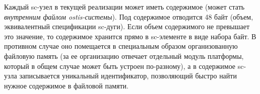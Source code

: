 \begin{SCn}
{Каждый sc-узел в текущей реализации может иметь содержимое (может стать \textit{внутренним файлом ostis-системы}). Под содержимое отводится 48 байт (объем, эквивалентный спецификации sc-дуги). Если объем содержимого не превышает это значение, то содержимое хранится прямо в sc-элементе в виде набора байт. В противном случае оно помещается в специальным образом организованную файловую память (за ее организацию отвечает отдельный модуль платформы, который в общем случае может быть устроен по-разному), а в содержимое sc-узла записывается уникальный идентификатор, позволяющий быстро найти нужное содержимое в файловой памяти.
}


\end{SCn}
